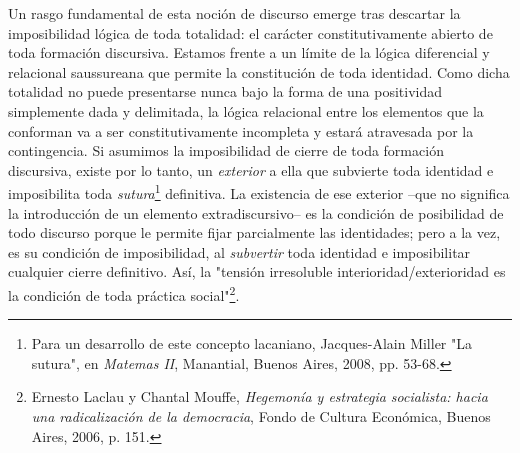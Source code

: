 \documentclass{book}
\begin{document}
Un rasgo fundamental de esta noción de discurso emerge tras descartar la
imposibilidad lógica de toda totalidad: el carácter constitutivamente
abierto de toda formación discursiva. Estamos frente a un límite de la
lógica diferencial y relacional saussureana que permite la constitución
de toda identidad. Como dicha totalidad no puede presentarse nunca bajo
la forma de una positividad simplemente dada y delimitada, la lógica
relacional entre los elementos que la conforman va a ser
constitutivamente incompleta y estará atravesada por la contingencia. Si
asumimos la imposibilidad de cierre de toda formación discursiva, existe
por lo tanto, un \emph{exterior} a ella que subvierte toda identidad e
imposibilita toda \emph{sutura}\footnote{Para un desarrollo de este
  concepto lacaniano, Jacques-Alain Miller "La sutura", en \emph{Matemas
  II}, Manantial, Buenos Aires, 2008, pp. 53-68.} definitiva. La
existencia de ese exterior --que no significa la introducción de un
elemento extradiscursivo-- es la condición de posibilidad de todo
discurso porque le permite fijar parcialmente las identidades; pero a la
vez, es su condición de imposibilidad, al \emph{subvertir} toda
identidad e imposibilitar cualquier cierre definitivo. Así, la "tensión
irresoluble interioridad/exterioridad es la condición de toda práctica
social"\footnote{Ernesto Laclau y Chantal Mouffe, \emph{Hegemonía y
  estrategia socialista: hacia una radicalización de la democracia},
  Fondo de Cultura Económica, Buenos Aires, 2006, p. 151.}.
\end{document}
